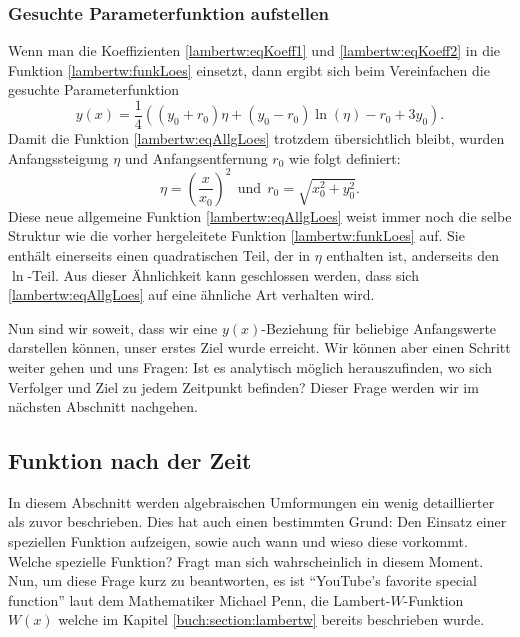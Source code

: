 \subsubsection{Gesuchte Parameterfunktion aufstellen
	\label{lambertw:subsubsection:ParamFunk}}
Wenn man die Koeffizienten \eqref{lambertw:eqKoeff1} und \eqref{lambertw:eqKoeff2} in die Funktion \eqref{lambertw:funkLoes} einsetzt, dann ergibt sich beim Vereinfachen die gesuchte Parameterfunktion
\begin{equation}
	y(x)
	=
	\frac{1}{4}\left(\left(y_0+r_0\right)\eta+\left(y_0-r_0\right)
	\operatorname{ln}\left(\eta\right)-r_0+3y_0\right).
	\label{lambertw:eqAllgLoes}
\end{equation}
Damit die Funktion \eqref{lambertw:eqAllgLoes} trotzdem übersichtlich bleibt, wurden Anfangssteigung \(\eta\) und Anfangsentfernung \(r_0\) wie folgt definiert:
\begin{equation}
	\eta
	=
	\left(\frac{x}{x_0}\right)^2
	\:\:\text{und}\:\:
	r_0
	=
	\sqrt{x_0^2+y_0^2}.
\end{equation}
Diese neue allgemeine Funktion \eqref{lambertw:eqAllgLoes} weist immer noch die selbe Struktur wie die vorher hergeleitete Funktion \eqref{lambertw:funkLoes} auf. Sie enthält einerseits einen quadratischen Teil, der in \(\eta\) enthalten ist, anderseits den \(\operatorname{ln}\)-Teil. Aus dieser Ähnlichkeit kann geschlossen werden, dass sich \eqref{lambertw:eqAllgLoes} auf eine ähnliche Art verhalten wird.

Nun sind wir soweit, dass wir eine \(y(x)\)-Beziehung für beliebige Anfangswerte darstellen können, unser erstes Ziel wurde erreicht. Wir können aber einen Schritt weiter gehen und uns Fragen: Ist es analytisch möglich herauszufinden, wo sich Verfolger und Ziel zu jedem Zeitpunkt befinden? Dieser Frage werden wir im nächsten Abschnitt nachgehen.

\subsection{Funktion nach der Zeit 
	\label{lambertw:subsection:FunkNachT}}
In diesem Abschnitt werden algebraischen Umformungen ein wenig detaillierter als zuvor beschrieben. Dies hat auch einen bestimmten Grund: Den Einsatz einer speziellen Funktion aufzeigen, sowie auch wann und wieso diese vorkommt. Welche spezielle Funktion? Fragt man sich wahrscheinlich in diesem Moment. Nun, um diese Frage kurz zu beantworten, es ist ``YouTube's favorite special function'' laut dem Mathematiker Michael Penn, die Lambert-\(W\)-Funktion \(W(x)\) welche im Kapitel \ref{buch:section:lambertw} bereits beschrieben wurde.

